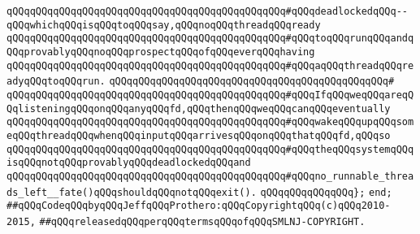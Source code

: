 \verb|qQQqqQQqqQQqqQQqqQQqqQQqqQQqqQQqqQQqqQQqqQQqqQQq#qQQqdeadlockedqQQq--qQQqwhichqQQqisqQQqtoqQQqsay,qQQqnoqQQqthreadqQQqready|\newline
\verb|qQQqqQQqqQQqqQQqqQQqqQQqqQQqqQQqqQQqqQQqqQQqqQQq#qQQqtoqQQqrunqQQqandqQQqprovablyqQQqnoqQQqprospectqQQqofqQQqeverqQQqhaving|\newline
\verb|qQQqqQQqqQQqqQQqqQQqqQQqqQQqqQQqqQQqqQQqqQQqqQQq#qQQqaqQQqthreadqQQqreadyqQQqtoqQQqrun.|\newline
\verb|qQQqqQQqqQQqqQQqqQQqqQQqqQQqqQQqqQQqqQQqqQQqqQQq#|\newline
\verb|qQQqqQQqqQQqqQQqqQQqqQQqqQQqqQQqqQQqqQQqqQQqqQQq#qQQqIfqQQqweqQQqareqQQqlisteningqQQqonqQQqanyqQQqfd,qQQqthenqQQqweqQQqcanqQQqeventually|\newline
\verb|qQQqqQQqqQQqqQQqqQQqqQQqqQQqqQQqqQQqqQQqqQQqqQQq#qQQqwakeqQQqupqQQqsomeqQQqthreadqQQqwhenqQQqinputqQQqarrivesqQQqonqQQqthatqQQqfd,qQQqso|\newline
\verb|qQQqqQQqqQQqqQQqqQQqqQQqqQQqqQQqqQQqqQQqqQQqqQQq#qQQqtheqQQqsystemqQQqisqQQqnotqQQqprovablyqQQqdeadlockedqQQqand|\newline
\verb|qQQqqQQqqQQqqQQqqQQqqQQqqQQqqQQqqQQqqQQqqQQqqQQq#qQQqno_runnable_threads_left__fate()qQQqshouldqQQqnotqQQqexit().|\newline
\verb|qQQqqQQqqQQqqQQq};|\newline
\verb|end;|\newline
\newline
\verb|##qQQqCodeqQQqbyqQQqJeffqQQqProthero:qQQqCopyrightqQQq(c)qQQq2010-2015,|\newline
\verb|##qQQqreleasedqQQqperqQQqtermsqQQqofqQQqSMLNJ-COPYRIGHT.|\newline

